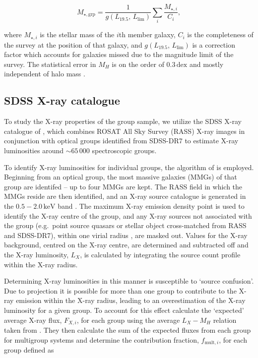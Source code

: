 \begin{equation}
  M_{\star,\mathrm{grp}} = \frac{1}{g(L_{19.5},\,L_\mathrm{lim})}
  \sum_i \frac{M_{\star,i}}{C_i},
\end{equation}

\noindent
where $M_{\star,i}$ is the stellar mass of the $i$th member galaxy,
$C_i$ is the completeness of the survey at the position of that
galaxy, and $g(L_{19.5},\,L_\mathrm{lim})$ is a correction factor
which accounts for galaxies missed due to the magnitude limit of the
survey.  The statistical error in $M_H$ is on the order of
$0.3\,\mathrm{dex}$ and mostly independent of halo mass
\citep{yang2007}.

\subsection{SDSS X-ray catalogue}

To study the X-ray properties of the group sample, we utilize the SDSS
X-ray catalogue of \citet{wang2014}, which combines ROSAT All Sky
Survey (RASS) X-ray images in conjunction with optical groups
identified from SDSS-DR7 \citep{yang2007} to estimate X-ray
luminosities around $\sim 65\,000$ spectroscopic groups.
\par
To identify X-ray luminosities for individual groups, the algorithm of
\citet{shen2008} is employed.  Beginning from an optical group, the
most massive galaxies (MMGs) of that group are identifed -- up to four
MMGs are kept.  The RASS field in which the MMGs reside are then
identified, and an X-ray source catalogue is generated in the
$0.5-2.0\,\mathrm{keV}$ band \citep{wang2014}.  The maximum X-ray
emission density point is used to identify the X-ray centre of the
group, and any X-ray sources not associated with the group
(e.g.\ point source quasars or stellar object cross-matched from RASS
and SDSS-DR7), within one virial radius , are masked out.  Values for
the X-ray background, centred on the X-ray centre, are determined and
subtracted off and the X-ray luminosity, $L_X$, is calculated by
integrating the source count profile within the X-ray radius.
\par
Determining X-ray luminosities in this manner is susceptible to
`source confusion'.  Due to projection it is possible for more than
one group to contribute to the X-ray emission within the X-ray radius,
leading to an overestimation of the X-ray luminosity for a given
group.  To account for this effect \citet{wang2014} calculate the
`expected' average X-ray flux, $F_{X,i}$, for each group using the
average $L_X - M_H$ relation taken from \citet{mantz2010}.  They then
calculate the sum of the expected fluxes from each group for
multigroup systems and determine the contribution fraction,
$f_{\mathrm{mult},i}$, for each group defined as

